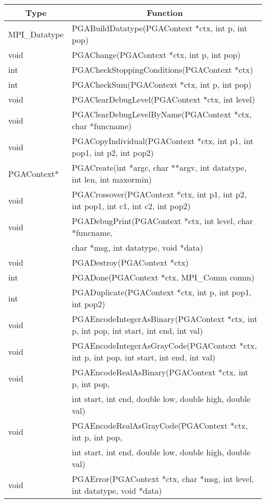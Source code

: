 \documentclass{report}
\begin{document}
\begin{tabular}{|l|l|} \hline\hline
\multicolumn{1}{|c|}{Type} &
\multicolumn{1}{c|}{Function}  \\  \hline\hline
MPI\_Datatype & PGABuildDatatype(PGAContext *ctx, int p, int pop) \\ \hline
void &  PGAChange(PGAContext *ctx, int p, int pop) \\ \hline
int &  PGACheckStoppingConditions(PGAContext *ctx) \\ \hline
int &  PGACheckSum(PGAContext *ctx, int p, int pop) \\ \hline
void &  PGAClearDebugLevel(PGAContext *ctx, int level) \\ \hline
void &  PGAClearDebugLevelByName(PGAContext *ctx, char *funcname) \\ \hline
void &  PGACopyIndividual(PGAContext *ctx, int p1, int pop1, int p2, int pop2)
\\ \hline
PGAContext* &  PGACreate(int *argc, char **argv, int datatype, int len, int maxormin) \\ \hline
void &  PGACrossover(PGAContext *ctx, int p1, int p2, int pop1, int c1, int
c2, int pop2) \\ \hline
void &  PGADebugPrint(PGAContext *ctx, int level, char *funcname, \\
     &  char *msg, int datatype, void *data) \\ \hline
void &  PGADestroy(PGAContext *ctx) \\ \hline
int &  PGADone(PGAContext *ctx, MPI\_Comm comm) \\ \hline
int &  PGADuplicate(PGAContext *ctx, int p, int pop1, int pop2) \\ \hline
void &  PGAEncodeIntegerAsBinary(PGAContext *ctx, int p, int pop, int start,
int end, int val) \\ \hline
void &  PGAEncodeIntegerAsGrayCode(PGAContext *ctx, int p, int pop, int start,
int end, int val) \\ \hline
void &  PGAEncodeRealAsBinary(PGAContext *ctx, int p, int pop, \\
     &  int start, int end, double low, double high, double val) \\ \hline
void &  PGAEncodeRealAsGrayCode(PGAContext *ctx, int p, int pop, \\
     &  int start, int end, double low, double high, double val) \\ \hline
void &  PGAError(PGAContext *ctx, char *msg, int level, int datatype, void
*data) \\ \hline

\end{tabular}
\end{document}
